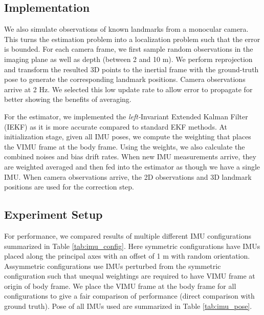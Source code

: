 \documentclass[conference]{IEEEtran}
\begin{document}
\subsection{Implementation}

We also simulate observations of known landmarks from a monocular camera. This turns the estimation problem into a localization problem such that the error is bounded. For each camera frame, we first sample random observations in the imaging plane as well as depth (between 2 and 10 m). We perform reprojection and transform the resulted 3D points to the inertial frame with the ground-truth pose to generate the corresponding landmark positions. Camera observations arrive at 2 Hz. We selected this low update rate to allow error to propagate for better showing the benefits of averaging.

For the estimator, we implemented the \textit{left-}Invariant Extended Kalman Filter (IEKF) \cite{IEKF} as it is more accurate compared to standard EKF methods. At initialization stage, given all IMU poses, we compute the weighting that places the VIMU frame at the body frame. Using the weights, we also calculate the combined noises and bias drift rates. When new IMU measurements arrive, they are weighted averaged and then fed into the estimator as though we have a single IMU. When camera observations arrive, the 2D observations and 3D landmark positions are used for the correction step.

\subsection{Experiment Setup}

For performance, we compared results of multiple different IMU configurations summarized in Table \ref{tab:imu_config}. Here symmetric configurations have IMUs placed along the principal axes with an offset of 1 m with random orientation. Assymmetric configurations use IMUs perturbed from the symmetric configuration such that unequal weightings are required to have VIMU frame at origin of body frame. We place the VIMU frame at the body frame for all configurations to give a fair comparison of performance (direct comparison with ground truth). Pose of all IMUs used are summarized in Table \ref{tab:imu_pose}.
\end{document}
